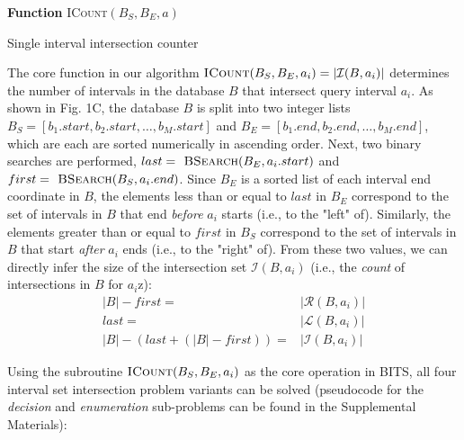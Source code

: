 \documentclass{bioinfo}
\begin{document}
        \begin{algorithm}[h]
                \DontPrintSemicolon
                \footnotesize
                \BlankLine
                \textbf{Function} \textsc{ICount}$(B_S,B_E,a)$
                \caption{Single interval intersection counter}
        \end{algorithm}

        The core function in our algorithm 
        $\textsc{ICount}(B_S,B_E,a_i) = |\mathcal{I}(B,a_i)|$ determines the number of
        intervals in the database $B$ that intersect query interval $a_i$.  As shown in
        Fig. 1C, the database $B$ is split into two integer lists 
        $B_S = [b_1.start, b_2.start, \dots, b_M.start]$ and 
        $B_E = [b_1.end, b_2.end, \dots, b_M.end]$, which are each are sorted  
        numerically in ascending order.  Next, two binary searches are performed,
        $last=\textsc{ BSearch}(B_E, a_i.start)$ and 
        $first=\textsc{ BSearch}(B_S, a_i.end)$.  Since $B_E$ is a sorted list of each
        interval end coordinate in $B$, the elements
        less than or equal to $last$ in $B_E$ correspond to the set of intervals in $B$
        that end \emph{before} $a_i$ starts (i.e., to the "left" of).
        Similarly, the elements greater than or equal to $first$ in $B_S$ correspond to the
        set of intervals in $B$ that start \emph{after} $a_i$ ends 
        (i.e., to the "right" of).  From these two values, 
        we can directly infer the size of the intersection set $\mathcal{I}(B,a_i)$ 
        (i.e., the \emph{count} of intersections in $B$ for $a_i$z):
        \begin{equation*}
                \begin{split}
                        |B|-first=&|\mathcal{R}(B,a_i)| \\
                        last=&|\mathcal{L}(B,a_i)| \\ 
                        |B|-(last+(|B|-first))=&|\mathcal{I}(B,a_i)|
                \end{split}
        \end{equation*}

        Using the subroutine $\textsc{ICount}(B_S,B_E,a_i)$ as the core operation
        in BITS, all four interval set intersection problem variants can be 
        solved (pseudocode for the \emph{decision} and \emph{enumeration} sub-problems
        can be found in the Supplemental Materials):
\end{document}
